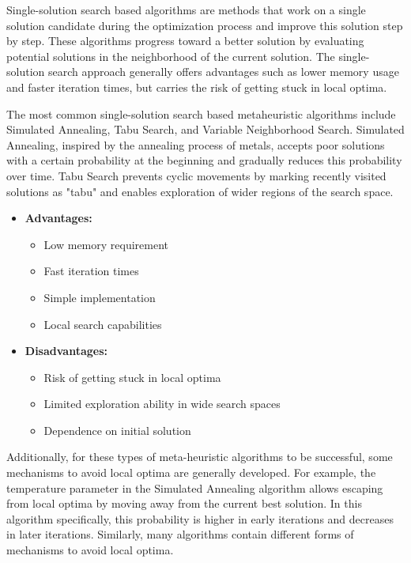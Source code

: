 Single-solution search based algorithms are methods that work on a single solution candidate during the optimization process and improve this solution step by step. These algorithms progress toward a better solution by evaluating potential solutions in the neighborhood of the current solution. The single-solution search approach generally offers advantages such as lower memory usage and faster iteration times, but carries the risk of getting stuck in local optima.

The most common single-solution search based metaheuristic algorithms include Simulated Annealing, Tabu Search, and Variable Neighborhood Search. Simulated Annealing, inspired by the annealing process of metals, accepts poor solutions with a certain probability at the beginning and gradually reduces this probability over time. Tabu Search prevents cyclic movements by marking recently visited solutions as "tabu" and enables exploration of wider regions of the search space.

\begin{tcolorbox}[title=Characteristics of Single-Solution Search Based Algorithms]
\begin{itemize}
    \item \textbf{Advantages:}
        \begin{itemize}
            \item Low memory requirement
            \item Fast iteration times
            \item Simple implementation
            \item Local search capabilities
        \end{itemize}
    \item \textbf{Disadvantages:}
        \begin{itemize}
            \item Risk of getting stuck in local optima
            \item Limited exploration ability in wide search spaces
            \item Dependence on initial solution
        \end{itemize}
\end{itemize}
\end{tcolorbox}

Additionally, for these types of meta-heuristic algorithms to be successful, some mechanisms to avoid local optima are generally developed. For example, the temperature parameter in the Simulated Annealing algorithm allows escaping from local optima by moving away from the current best solution. In this algorithm specifically, this probability is higher in early iterations and decreases in later iterations. Similarly, many algorithms contain different forms of mechanisms to avoid local optima.

